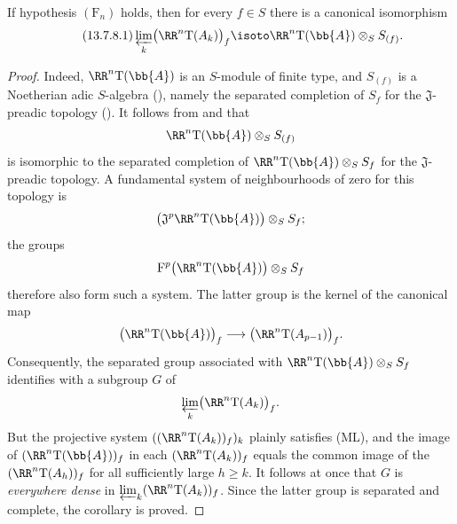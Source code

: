 \begin{corollary}[13.7.8]
\label{0.13.7.8}
If hypothesis $(\mathrm{F}_n)$ holds, then for every $f\in S$ there
is a canonical isomorphism
\begin{equation}
\label{0.13.7.8.1}
\tag{13.7.8.1}
  \varprojlim_k\bigl(\RR^n\mathrm{T}(A_k)\bigr)_f
  \isoto
  \RR^n\mathrm{T}(\bb{A})\otimes_S S_{(f)}.
\end{equation}
\end{corollary}

\begin{proof}
Indeed, $\RR^n\mathrm{T}(\bb{A})$ is an $S$-module of finite type,
and $S_{(f)}$ is a Noetherian adic $S$-algebra
(), namely the separated
completion of $S_f$ for the $\mathfrak{J}$-preadic topology
().
It follows from  and
 that
\[
  \RR^n\mathrm{T}(\bb{A})\otimes_S S_{(f)}
\]
is isomorphic to the separated completion of
$\RR^n\mathrm{T}(\bb{A})\otimes_S S_f$ for the
$\mathfrak{J}$-preadic topology.
A fundamental system of neighbourhoods of zero for this topology
is
\[
  \bigl(
    \mathfrak{J}^p\RR^n\mathrm{T}(\bb{A})
  \bigr)\otimes_S S_f;
\]
the groups
\[
  \mathrm{F}^p\bigl(\RR^n\mathrm{T}(\bb{A})\bigr)
  \otimes_S S_f
\]
therefore also form such a system.
The latter group is the kernel of the canonical map
\[
  \bigl(\RR^n\mathrm{T}(\bb{A})\bigr)_f
  \longrightarrow
  \bigl(\RR^n\mathrm{T}(A_{p-1})\bigr)_f.
\]
Consequently, the separated group associated with
$\RR^n\mathrm{T}(\bb{A})\otimes_S S_f$ identifies with a subgroup
$G$ of
\[
  \varprojlim_k\bigl(\RR^n\mathrm{T}(A_k)\bigr)_f.
\]
But the projective system
$((\RR^n\mathrm{T}(A_k))_f)_k$ plainly satisfies {\rm(ML)}, and the
image of $(\RR^n\mathrm{T}(\bb{A}))_f$ in each
$(\RR^n\mathrm{T}(A_k))_f$ equals the common image of the
$(\RR^n\mathrm{T}(A_h))_f$ for all sufficiently large $h\geq k$.
It follows at once that $G$ is \emph{everywhere dense} in
$\varprojlim_k(\RR^n\mathrm{T}(A_k))_f$.
Since the latter group is separated and complete, the corollary is
proved.
\end{proof}
